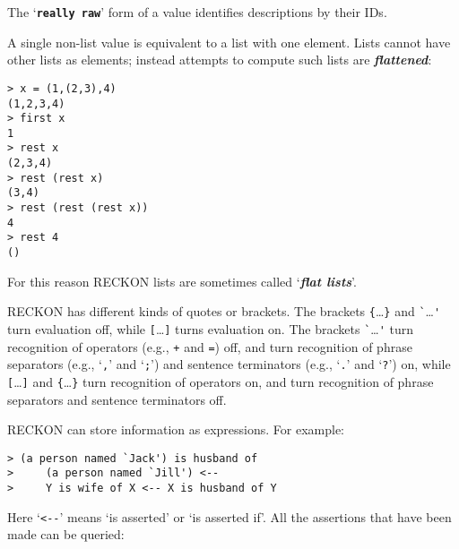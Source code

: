 \documentclass[12pt]{article}
\newcommand{\TT}[1]{{\tt \bfseries #1}}
\newcommand{\key}[1]{{\bf \em #1}\index{#1}}
\newcommand{\skey}[2]{{\bf \em #1#2}\index{#1}}
\newenvironment{indpar}[1][0.3in]%
	{\begin{list}{}%
		     {\setlength{\itemsep}{0in}%
		      \setlength{\topsep}{0in}%
		      \setlength{\parsep}{1ex}%
		      \setlength{\labelwidth}{#1}%
		      \setlength{\leftmargin}{#1}%
		      \addtolength{\leftmargin}{\labelsep}}%
	 \item}%
	{\end{list}}
\begin{document}
The `\TT{really raw}' form of a value identifies descriptions by their IDs.

A single non-list value is equivalent to a list with one element.
Lists cannot have other lists as elements; instead attempts to
compute such lists are \key{flattened}:

\begin{indpar}
\verb|> x = (1,(2,3),4)| \\
\verb|(1,2,3,4)| \\
\verb|> first x| \\
\verb|1| \\
\verb|> rest x| \\
\verb|(2,3,4)| \\
\verb|> rest (rest x)| \\
\verb|(3,4)| \\
\verb|> rest (rest (rest x))| \\
\verb|4| \\
\verb|> rest 4| \\
\verb|()|
\end{indpar}

For this reason RECKON lists are sometimes called `\skey{flat list}s'.

RECKON has different kinds of quotes or brackets.  The brackets
\verb|{|\ldots\verb|}| and \verb|`|\ldots\verb|'|
turn
evaluation off, while \verb|[|\ldots\verb|]| turns evaluation on.
The brackets \verb|`|\ldots\verb|'| turn
recognition of operators (e.g., \verb|+| and \verb|=|) off, and turn
recognition of phrase separators (e.g., `\verb|,|' and `\verb|;|') and
sentence terminators (e.g., `\verb|.|' and `\verb|?|') on, while
\verb|[|\ldots\verb|]| and \verb|{|\ldots\verb|}|
turn recognition of operators on, and turn recognition of phrase
separators and sentence terminators off.

RECKON can store information as expressions.  For example:

\begin{indpar}
\verb|> (a person named `Jack') is husband of| \\
\verb|>     (a person named `Jill') <--| \\
\verb|>     Y is wife of X <-- X is husband of Y|
\end{indpar}

Here `\verb|<--|' means `is asserted' or `is asserted if'.
All the assertions that have been made can be queried:
\end{document}
